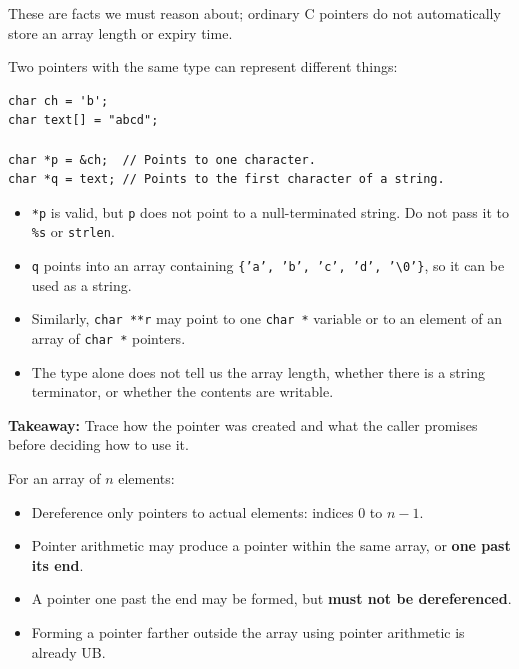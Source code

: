 \documentclass[11pt,a4paper]{article}
\begin{document}
These are facts we must reason about; ordinary C pointers do not
automatically store an array length or expiry time.


Two pointers with the same type can represent different things:

\begin{lstlisting}[style=cscode]
char ch = 'b';
char text[] = "abcd";

char *p = &ch;  // Points to one character.
char *q = text; // Points to the first character of a string.
\end{lstlisting}

\begin{itemize}
    \item \texttt{*p} is valid, but \texttt{p} does not point to a
          null-terminated string. Do not pass it to
          \texttt{\%s} or \texttt{strlen}.
    \item \texttt{q} points into an array containing
          \texttt{\{'a', 'b', 'c', 'd', '\textbackslash0'\}},
          so it can be used as a string.
    \item Similarly, \texttt{char **r} may point to one
          \texttt{char *} variable or to an element of an array
          of \texttt{char *} pointers.
    \item The type alone does not tell us the array length,
          whether there is a string terminator, or whether the
          contents are writable.
\end{itemize}

\textbf{Takeaway:}
Trace how the pointer was created and what the caller promises
before deciding how to use it.


For an array of \(n\) elements:

\begin{itemize}
    \item Dereference only pointers to actual elements:
          indices \(0\) to \(n-1\).
    \item Pointer arithmetic may produce a pointer within the
          same array, or \textbf{one past its end}.
    \item A pointer one past the end may be formed, but
          \textbf{must not be dereferenced}.
    \item Forming a pointer farther outside the array using
          pointer arithmetic is already UB.
\end{itemize}
\end{document}
